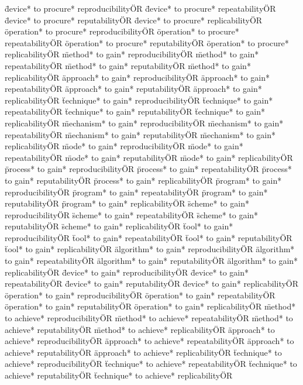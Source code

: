 \documentclass[
10pt, %
a4paper, %
oneside, %
headinclude,footinclude, %
BCOR5mm, %
]{scrartcl}
\begin{document}
\"device* to procure* reproducibility\" OR \"device* to procure* repeatability\" OR \"device* to procure* reputability\" OR \"device* to procure* replicability\" OR 
\"operation* to procure* reproducibility\" OR \"operation* to procure* repeatability\" OR \"operation* to procure* reputability\" OR \"operation* to procure* replicability\" OR 
\"method* to gain* reproducibility\" OR \"method* to gain* repeatability\" OR \"method* to gain* reputability\" OR \"method* to gain* replicability\" OR 
\"approach* to gain* reproducibility\" OR \"approach* to gain* repeatability\" OR \"approach* to gain* reputability\" OR \"approach* to gain* replicability\" OR 
\"technique* to gain* reproducibility\" OR \"technique* to gain* repeatability\" OR \"technique* to gain* reputability\" OR \"technique* to gain* replicability\" OR 
\"mechanism* to gain* reproducibility\" OR \"mechanism* to gain* repeatability\" OR \"mechanism* to gain* reputability\" OR \"mechanism* to gain* replicability\" OR 
\"mode* to gain* reproducibility\" OR \"mode* to gain* repeatability\" OR \"mode* to gain* reputability\" OR \"mode* to gain* replicability\" OR 
\"process* to gain* reproducibility\" OR \"process* to gain* repeatability\" OR \"process* to gain* reputability\" OR \"process* to gain* replicability\" OR 
\"program* to gain* reproducibility\" OR \"program* to gain* repeatability\" OR \"program* to gain* reputability\" OR \"program* to gain* replicability\" OR 
\"scheme* to gain* reproducibility\" OR \"scheme* to gain* repeatability\" OR \"scheme* to gain* reputability\" OR \"scheme* to gain* replicability\" OR 
\"tool* to gain* reproducibility\" OR \"tool* to gain* repeatability\" OR \"tool* to gain* reputability\" OR \"tool* to gain* replicability\" OR 
\"algorithm* to gain* reproducibility\" OR \"algorithm* to gain* repeatability\" OR \"algorithm* to gain* reputability\" OR \"algorithm* to gain* replicability\" OR 
\"device* to gain* reproducibility\" OR \"device* to gain* repeatability\" OR \"device* to gain* reputability\" OR \"device* to gain* replicability\" OR 
\"operation* to gain* reproducibility\" OR \"operation* to gain* repeatability\" OR \"operation* to gain* reputability\" OR \"operation* to gain* replicability\" OR 
\"method* to achieve* reproducibility\" OR \"method* to achieve* repeatability\" OR \"method* to achieve* reputability\" OR \"method* to achieve* replicability\" OR 
\"approach* to achieve* reproducibility\" OR \"approach* to achieve* repeatability\" OR \"approach* to achieve* reputability\" OR \"approach* to achieve* replicability\" OR 
\"technique* to achieve* reproducibility\" OR \"technique* to achieve* repeatability\" OR \"technique* to achieve* reputability\" OR \"technique* to achieve* replicability\" OR 
\end{document}
